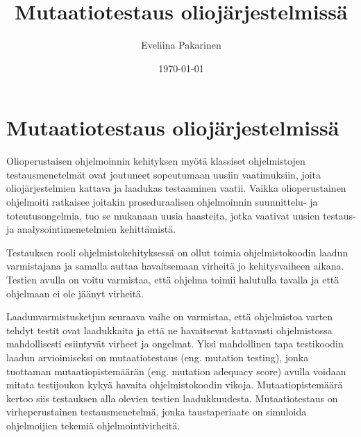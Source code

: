 \documentclass[finnish]{tktltiki2}
\title{Mutaatiotestaus oliojärjestelmissä}
\author{Eveliina Pakarinen}
\date{\today}
\theoremstyle{definition}
\theoremstyle{remark}
\begin{document}

\frontmatter      %

\maketitle        %



\mainmatter       %

\section{Mutaatiotestaus oliojärjestelmissä}



Olioperustaisen ohjelmoinnin kehityksen myötä klassiset ohjelmistojen testausmenetelmät ovat joutuneet sopeutumaan uusiin vaatimuksiin, joita oliojärjestelmien kattava ja laadukas testaaminen vaatii. Vaikka olioperustainen ohjelmoiti ratkaisee joitakin proseduraalisen ohjelmoinnin suunnittelu- ja toteutusongelmia, tuo se mukanaan uusia haasteita, jotka vaativat uusien testaus- ja analysointimenetelmien kehittämistä.~\cite{marianitest}

Testauksen rooli ohjelmistokehityksessä on ollut toimia ohjelmistokoodin laadun varmistajana ja samalla auttaa havaitsemaan virheitä jo kehitysvaiheen aikana. Testien avulla on voitu varmistaa, että ohjelma toimii halutulla tavalla ja että ohjelmaan ei ole jäänyt virheitä. 

Laadunvarmistusketjun seuraava vaihe on varmistaa, että ohjelmistoa varten tehdyt testit ovat laadukkaita ja että ne havaitsevat kattavasti ohjelmistossa mahdollisesti esiintyvät virheet ja ongelmat. Yksi mahdollinen tapa testikoodin laadun arvioimiseksi on mutaatiotestaus (eng. mutation testing), jonka tuottaman mutaatiopistemäärän (eng. mutation adequacy score) avulla voidaan mitata testijoukon kykyä havaita ohjelmistokoodin vikoja. Mutaatiopistemäärä kertoo siis testauksen alla olevien testien laadukkuudesta. Mutaatiotestaus on virheperustainen testausmenetelmä, jonka taustaperiaate on simuloida ohjelmoijien tekemiä ohjelmointivirheitä. ~\cite{jiaharmananalyysi} 
\end{document}
